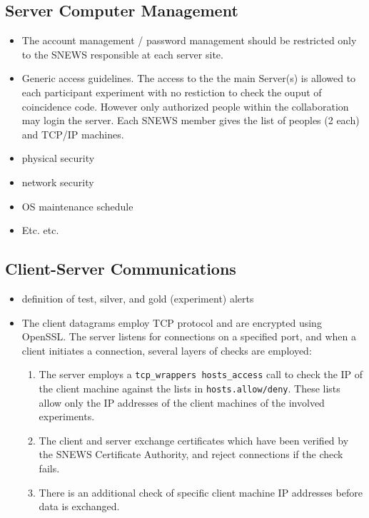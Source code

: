 \documentclass{article}
\begin{document}
\subsection{Server Computer Management}
\begin{itemize}
\item The account management / password management should be restricted only 
to the SNEWS responsible at each server site.
\item Generic access guidelines. The access to the the main Server(s) is allowed to each participant experiment with no restiction to check the ouput of coincidence code. However only authorized 
people within the collaboration may login the server. Each SNEWS member 
gives the list of peoples (2 each) and TCP/IP machines.

\item physical security
\item network security
\item OS maintenance schedule
\item Etc. etc.
\end{itemize}

\subsection{Client-Server Communications}
\begin{itemize}
\item definition of test, silver, and gold (experiment) alerts
\item The client datagrams employ TCP protocol and 
are encrypted using OpenSSL.  
The server listens for connections on a specified port,
and when a client initiates a connection, several layers
of checks are employed:
\begin{enumerate}
\item The server employs a \texttt{tcp\_wrappers hosts\_access}
call to check the IP of the client machine against the lists in
\texttt{hosts.allow/deny}.  These lists allow only the IP addresses
of the client machines of the involved experiments.
\item
The client and server exchange certificates which have been
verified by the SNEWS Certificate Authority, and reject
connections if the check fails.
\item There is an additional check of specific client machine
IP addresses before data is exchanged.
\end{enumerate}
\end{itemize}
\end{document}
